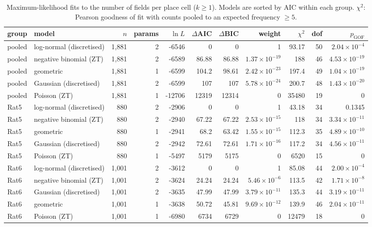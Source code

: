 \begin{table}[htbp]
\centering
\footnotesize
\caption{Maximum-likelihood fits to the number of fields per place cell ($k\geq1$). Models are sorted by AIC within each group. $\chi^2$: Pearson goodness of fit with counts pooled to an expected frequency $\geq5$.}
\label{tab:field_count:fits}
\begin{tabular}{llrrrrrrrrr}
\toprule
group & model & $n$ & params & $\ln L$ & $\Delta$AIC & $\Delta$BIC & weight & $\chi^2$ & dof & $p_{\mathrm{GOF}}$ \\
\midrule
pooled & log-normal (discretised) & 1{,}881 & 2 & -6546 & 0 & 0 & 1 & 93.17 & 50 & $2.04\times10^{-4}$ \\
pooled & negative binomial (ZT) & 1{,}881 & 2 & -6589 & 86.88 & 86.88 & $1.37\times10^{-19}$ & 188 & 46 & $4.53\times10^{-19}$ \\
pooled & geometric & 1{,}881 & 1 & -6599 & 104.2 & 98.61 & $2.42\times10^{-23}$ & 197.4 & 49 & $1.04\times10^{-19}$ \\
pooled & Gaussian (discretised) & 1{,}881 & 2 & -6599 & 107 & 107 & $5.78\times10^{-24}$ & 200.7 & 48 & $1.43\times10^{-20}$ \\
pooled & Poisson (ZT) & 1{,}881 & 1 & -12706 & 12319 & 12314 & 0 & 35480 & 19 & 0 \\
Rat5 & log-normal (discretised) & 880 & 2 & -2906 & 0 & 0 & 1 & 43.18 & 34 & 0.1345 \\
Rat5 & negative binomial (ZT) & 880 & 2 & -2940 & 67.22 & 67.22 & $2.53\times10^{-15}$ & 118 & 34 & $3.34\times10^{-11}$ \\
Rat5 & geometric & 880 & 1 & -2941 & 68.2 & 63.42 & $1.55\times10^{-15}$ & 112.3 & 35 & $4.89\times10^{-10}$ \\
Rat5 & Gaussian (discretised) & 880 & 2 & -2942 & 72.61 & 72.61 & $1.71\times10^{-16}$ & 117.2 & 34 & $4.56\times10^{-11}$ \\
Rat5 & Poisson (ZT) & 880 & 1 & -5497 & 5179 & 5175 & 0 & 6520 & 15 & 0 \\
Rat6 & log-normal (discretised) & 1{,}001 & 2 & -3612 & 0 & 0 & 1 & 85.08 & 44 & $2.00\times10^{-4}$ \\
Rat6 & negative binomial (ZT) & 1{,}001 & 2 & -3624 & 24.24 & 24.24 & $5.46\times10^{-6}$ & 113.5 & 42 & $1.71\times10^{-8}$ \\
Rat6 & Gaussian (discretised) & 1{,}001 & 2 & -3635 & 47.99 & 47.99 & $3.79\times10^{-11}$ & 135.3 & 44 & $3.19\times10^{-11}$ \\
Rat6 & geometric & 1{,}001 & 1 & -3638 & 50.72 & 45.81 & $9.69\times10^{-12}$ & 139.9 & 46 & $2.04\times10^{-11}$ \\
Rat6 & Poisson (ZT) & 1{,}001 & 1 & -6980 & 6734 & 6729 & 0 & 12479 & 18 & 0 \\
\bottomrule
\end{tabular}
\end{table}
